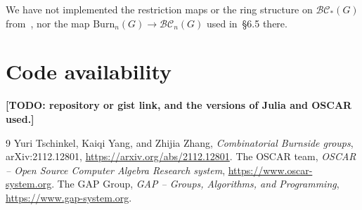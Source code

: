 \documentclass[11pt]{article}
\newcommand{\todo}[1]{\textbf{[TODO: #1]}}
\newcommand{\BC}{\mathcal{BC}}   %
\begin{document}
We have not implemented the restriction maps or the ring structure on
$\BC_*(G)$ from~\cite{TYZ}, nor the map $\mathrm{Burn}_n(G)\to\BC_n(G)$ used
in~\S6.5 there.

\section{Code availability}

\todo{repository or gist link, and the versions of Julia and OSCAR used.}

\begin{thebibliography}{9}
 Yuri Tschinkel, Kaiqi Yang, and Zhijia Zhang,
  \emph{Combinatorial Burnside groups}, arXiv:2112.12801,
  \url{https://arxiv.org/abs/2112.12801}.
 The OSCAR team, \emph{OSCAR -- Open Source Computer Algebra Research system},
  \url{https://www.oscar-system.org}.
 The GAP Group, \emph{GAP -- Groups, Algorithms, and Programming},
  \url{https://www.gap-system.org}.
\end{thebibliography}
\end{document}
